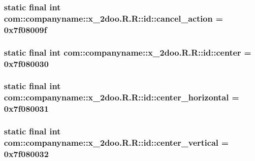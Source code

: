 \hypertarget{classcom_1_1companyname_1_1x__2doo_1_1_r_1_1id_d5c049cb8bcbefa33ff9d74960a022fd}{
\subsubsection[{cancel\_\-action}]{\setlength{\rightskip}{0pt plus 5cm}static final int com::companyname::x\_\-2doo.R.R::id::cancel\_\-action = 0x7f08009f}}
\label{classcom_1_1companyname_1_1x__2doo_1_1_r_1_1id_d5c049cb8bcbefa33ff9d74960a022fd}


\hypertarget{classcom_1_1companyname_1_1x__2doo_1_1_r_1_1id_7bf7ec1d2426e5e370be6b614b4d4d6b}{
\subsubsection[{center}]{\setlength{\rightskip}{0pt plus 5cm}static final int com::companyname::x\_\-2doo.R.R::id::center = 0x7f080030}}
\label{classcom_1_1companyname_1_1x__2doo_1_1_r_1_1id_7bf7ec1d2426e5e370be6b614b4d4d6b}


\hypertarget{classcom_1_1companyname_1_1x__2doo_1_1_r_1_1id_24b84c54ec5276a4e8ca3284815f964c}{
\subsubsection[{center\_\-horizontal}]{\setlength{\rightskip}{0pt plus 5cm}static final int com::companyname::x\_\-2doo.R.R::id::center\_\-horizontal = 0x7f080031}}
\label{classcom_1_1companyname_1_1x__2doo_1_1_r_1_1id_24b84c54ec5276a4e8ca3284815f964c}


\hypertarget{classcom_1_1companyname_1_1x__2doo_1_1_r_1_1id_bd327b77ad3fe28682ac5bfceeaa89ad}{
\subsubsection[{center\_\-vertical}]{\setlength{\rightskip}{0pt plus 5cm}static final int com::companyname::x\_\-2doo.R.R::id::center\_\-vertical = 0x7f080032}}
\label{classcom_1_1companyname_1_1x__2doo_1_1_r_1_1id_bd327b77ad3fe28682ac5bfceeaa89ad}


